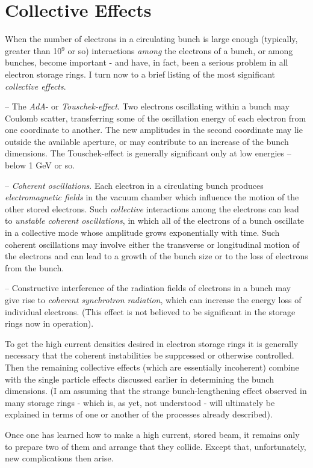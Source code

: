 \documentclass[../sands-adaptation.tex]{subfiles}
\begin{document}
\section{Collective Effects} \label{sec:1.3}
When the number of electrons in a circulating bunch is large enough (typically, greater than 10$^9$ or so) interactions \emph{among} the electrons of a bunch, or among bunches, become important - and have, in fact, been a serious problem in all electron storage rings. I turn now to a brief listing of the most significant \emph{collective effects}.

-- The \emph{AdA}- or \emph{Touschek-effect}. Two electrons oscillating within a bunch may Coulomb scatter, transferring some of the oscillation energy of each electron from one coordinate to another. The new amplitudes in the second coordinate may lie outside the available aperture, or may contribute to an increase of the bunch dimensions. The Touschek-effect is generally significant only at low energies -- below 1 GeV or so.

-- \emph{Coherent oscillations}. Each electron in a circulating bunch produces \emph{electromagnetic fields} in the vacuum chamber which influence the motion of the other stored electrons. Such \emph{collective} interactions among the electrons can lead to \emph{unstable coherent oscillations}, in which all of the electrons of a bunch oscillate in a collective mode whose amplitude grows exponentially with time. Such coherent oscillations may involve either the transverse or longitudinal motion of the electrons and can lead to a growth of the bunch size or to the loss of electrons from the bunch.

-- Constructive interference of the radiation fields of electrons in a bunch may give rise to \emph{coherent synchrotron radiation}, which can increase the energy loss of individual electrons. (This effect is not believed to be significant in the storage rings now in operation).

To get the high current densities desired in electron storage rings it is generally necessary that the coherent instabilities be suppressed or otherwise controlled. Then the remaining collective effects (which are essentially incoherent) combine with the single particle effects discussed earlier in determining the bunch dimensions. (I am assuming that the strange bunch-lengthening effect observed in many storage rings - which is, as yet, not understood - will ultimately be explained in terms of one or another of the processes already described).

Once one has learned how to make a high current, stored beam, it remains only to prepare two of them and arrange that they collide. Except that, unfortunately, new complications then arise.
\end{document}
